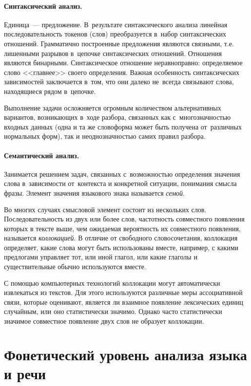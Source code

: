 \documentclass[12pt]{article}
\theoremstyle{definition}
\theoremstyle{remark}
\numberwithin{equation}{section}
\begin{document}
\paragraph{Синтаксический анализ.} Единица~--- предложение.
В~результате синтаксического анализа линейная последовательность
токенов (слов) преобразуется в~набор синтаксических отношений.
Грамматично построенные предложения являются связными, т.е.
лишенными разрывов в~цепочке синтаксических отношений. Отношения
являются бинарными. Синтаксическое отношение неравноправно:
определяемое слово <<главнее>> своего определения. Важная
особенность синтаксических зависимостей заключается в~том,
что они далеко не~всегда связывают слова, находящиеся рядом
в~цепочке.

Выполнение задачи осложняется огромным количеством альтернативных
вариантов, возникающих в~ходе разбора, связанных как
с~многозначностью входных данных (одна и та же словоформа может
быть получена от~различных нормальных форм), так и неоднозначностью
самих правил разбора.

\paragraph{Семантический анализ.} Занимается решением задач,
связанных с~возможностью определения значения слова в~зависимости
от~контекста и конкретной ситуации, понимания смысла фразы.
Элемент значения языкового знака называется {\sl семой}.

Во многих случаях смысловой элемент состоит из нескольких слов.
Последовательность из двух или более слов, частотность совместного
появления которых в тексте выше, чем ожидаемая вероятность их
совместного появления, называется {\sl коллокацией}. В отличие
от свободного словосочетания, коллокация определяет, какие слова
могут быть использованы вместе, например, с какими предлогами
управляет тот, или иной глагол, или какие глаголы и существительные
обычно используются вместе.

С помощью компьютерных технологий коллокации могут автоматически
извлекаться из текстов. Для этого используются различные меры
ассоциативной связи, которые оценивают, является ли взаимное появление
лексических единиц случайным, или оно статистически значимо. Однако
часто статистически значимое совместное появление двух слов не образует
коллокации.

\section{Фонетический уровень анализа языка и речи}
\end{document}

